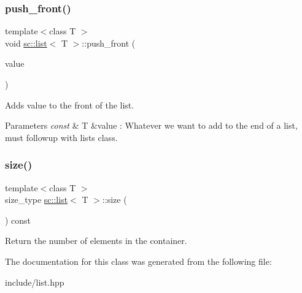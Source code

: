 \subsubsection{\texorpdfstring{push\+\_\+front()}{push\_front()}}
{\footnotesize\ttfamily template$<$class T $>$ \\
void \mbox{\hyperlink{classsc_1_1list}{sc\+::list}}$<$ T $>$\+::push\+\_\+front (\begin{DoxyParamCaption}\item[{const T \&}]{value }\end{DoxyParamCaption})}



Adds {\ttfamily value} to the front of the list. 


\begin{DoxyParams}{Parameters}
{\em const} & T \&value \+: Whatever we want to add to the end of a list, must followup with list\textquotesingle{}s class. \\
\hline
\end{DoxyParams}
\mbox{\label{classsc_1_1list_a0fe585f3f9e33058294c3a590c7bfdea}} 
\subsubsection{\texorpdfstring{size()}{size()}}
{\footnotesize\ttfamily template$<$class T $>$ \\
size\+\_\+type \mbox{\hyperlink{classsc_1_1list}{sc\+::list}}$<$ T $>$\+::size (\begin{DoxyParamCaption}{ }\end{DoxyParamCaption}) const}



Return the number of elements in the container. 



The documentation for this class was generated from the following file\+:\begin{DoxyCompactItemize}
\item 
include/list.\+hpp\end{DoxyCompactItemize}
